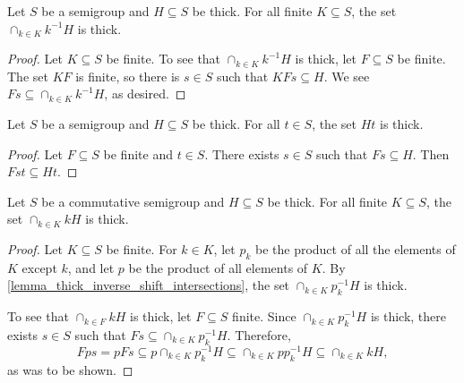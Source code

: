 \begin{lemma}
    \label{lemma_thick_inverse_shift_intersections}
    \label{lemma_preimage_intersection_of_thick_is_thick}
    \leanok{}
    Let $S$ be a semigroup and $H \subseteq S$ be thick.  For all finite $K \subseteq S$, the set $\cap_{k \in K} k^{-1} H$ is thick.
\end{lemma}

\begin{proof}
    Let $K \subseteq S$ be finite.  To see that $\cap_{k \in K} k^{-1} H$ is thick, let $F \subseteq S$ be finite.  The set $KF$ is finite, so there is $s \in S$ such that $KFs \subseteq H$. We see $Fs \subseteq \cap_{k \in K} k^{-1} H$, as desired.
\end{proof}

\begin{lemma}
    \label{lemma_thick_right_shift_is_thick}
    Let $S$ be a semigroup and $H \subseteq S$ be thick.  For all $t \in S$, the set $Ht$ is thick.
\end{lemma}

\begin{proof}
    Let $F \subseteq S$ be finite and $t \in S$.  There exists $s \in S$ such that $Fs \subseteq H$.  Then $Fst \subseteq Ht$.
\end{proof}

\begin{lemma}
    \label{lemma_thick_shift_intersections}
    \leanok{}
    Let $S$ be a commutative semigroup and $H \subseteq S$ be thick. For all finite $K \subseteq S$, the set $\cap_{k \in K} kH$ is thick.
\end{lemma}


\begin{proof}
    Let $K \subseteq S$ be finite.  For $k \in K$, let $p_k$ be the product of all the elements of $K$ except $k$, and let $p$ be the product of all elements of $K$.  By \cref{lemma_thick_inverse_shift_intersections}, the set $\cap_{k \in K} p_k^{-1} H$ is thick.
    
    To see that $\cap_{k \in F} kH$ is thick, let $F \subseteq S$ finite.  Since $\cap_{k \in K} p_k^{-1} H$ is thick, there exists $s \in S$ such that $Fs \subseteq \cap_{k \in K} p_k^{-1} H$.  Therefore,
    \[Fps = p F s \subseteq p \cap_{k \in K} p_k^{-1} H \subseteq \cap_{k \in K} p p_k^{-1} H \subseteq \cap_{k \in K} k H,\]
    as was to be shown. 
\end{proof}

